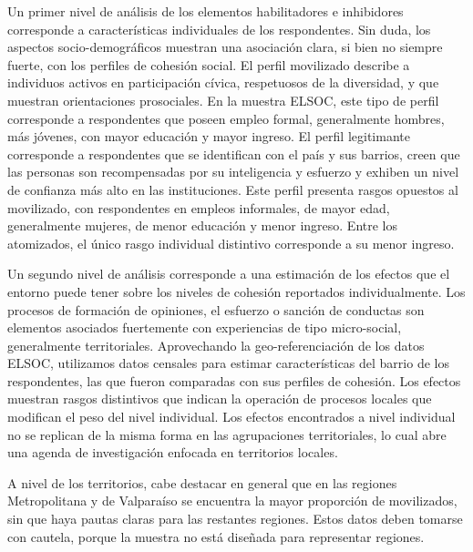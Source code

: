 \documentclass[
  12pt,
]{book}
\begin{document}
Un primer nivel de análisis de los elementos habilitadores e inhibidores corresponde a características individuales de los respondentes. Sin duda, los aspectos socio-demográficos muestran una asociación clara, si bien no siempre fuerte, con los perfiles de cohesión social. El perfil movilizado describe a individuos activos en participación cívica, respetuosos de la diversidad, y que muestran orientaciones prosociales. En la muestra ELSOC, este tipo de perfil corresponde a respondentes que poseen empleo formal, generalmente hombres, más jóvenes, con mayor educación y mayor ingreso. El perfil legitimante corresponde a respondentes que se identifican con el país y sus barrios, creen que las personas son recompensadas por su inteligencia y esfuerzo y exhiben un nivel de confianza más alto en las instituciones. Este perfil presenta rasgos opuestos al movilizado, con respondentes en empleos informales, de mayor edad, generalmente mujeres, de menor educación y menor ingreso. Entre los atomizados, el único rasgo individual distintivo corresponde a su menor ingreso.

Un segundo nivel de análisis corresponde a una estimación de los efectos que el entorno puede tener sobre los niveles de cohesión reportados individualmente. Los procesos de formación de opiniones, el esfuerzo o sanción de conductas son elementos asociados fuertemente con experiencias de tipo micro-social, generalmente territoriales. Aprovechando la geo-referenciación de los datos ELSOC, utilizamos datos censales para estimar características del barrio de los respondentes, las que fueron comparadas con sus perfiles de cohesión. Los efectos muestran rasgos distintivos que indican la operación de procesos locales que modifican el peso del nivel individual. Los efectos encontrados a nivel individual no se replican de la misma forma en las agrupaciones territoriales, lo cual abre una agenda de investigación enfocada en territorios locales.

A nivel de los territorios, cabe destacar en general que en las regiones Metropolitana y de Valparaíso se encuentra la mayor proporción de movilizados, sin que haya pautas claras para las restantes regiones. Estos datos deben tomarse con cautela, porque la muestra no está diseñada para representar regiones.
\end{document}
